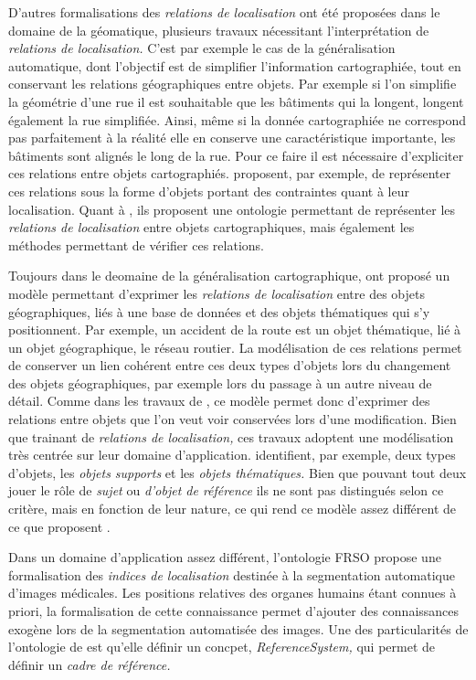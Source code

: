 D'autres formalisations des \emph{relations de localisation} ont été
proposées dans le domaine de la géomatique, plusieurs travaux
nécessitant l'interprétation de \emph{relations de localisation.}
C'est par exemple le cas de la généralisation automatique, dont
l'objectif est de simplifier l'information cartographiée, tout en
conservant les relations géographiques entre objets. Par exemple si
l'on simplifie la géométrie d'une rue il est souhaitable que les
bâtiments qui la longent, longent également la rue simplifiée. Ainsi,
même si la donnée cartographiée ne correspond pas parfaitement à la
réalité elle en conserve une caractéristique importante, les bâtiments
sont alignés le long de la rue. Pour ce faire il est nécessaire
d'expliciter ces relations entre objets
cartographiés. \textcite{Duchene2004,Gaffuri2008} proposent, par
exemple, de représenter ces relations sous la forme d'objets portant
des contraintes quant à leur localisation. Quant à
\textcite{Touya2012}, ils proposent une ontologie permettant de
représenter les \emph{relations de localisation} entre objets
cartographiques, mais également les méthodes permettant de vérifier
ces relations.

Toujours dans le deomaine de la généralisation cartographique,
\textcite{Jaara2012} ont proposé un modèle permettant d'exprimer les
\emph{relations de localisation} entre des objets géographiques, liés
à une base de données et des objets thématiques qui s'y
positionnent. Par exemple, un accident de la route est un objet
thématique, lié à un objet géographique, le réseau routier. La
modélisation de ces relations permet de conserver un lien cohérent
entre ces deux types d'objets lors du changement des objets
géographiques, par exemple lors du passage à un autre niveau de
détail. Comme dans les travaux de \textcite{Duchene2004,Gaffuri2008,
  Touya2012}, ce modèle permet donc d'exprimer des relations entre
objets que l'on veut voir conservées lors d'une modification. Bien que
trainant de \emph{relations de localisation,} ces travaux adoptent une
modélisation très centrée sur leur domaine
d’application. \textcite{Jaara2012} identifient, par exemple, deux
types d'objets, les \emph{objets supports} et les \emph{objets
  thématiques.} Bien que pouvant tout deux jouer le rôle de
\emph{sujet} ou \emph{d'objet de référence} ils ne sont pas distingués
selon ce critère, mais en fonction de leur nature, ce qui rend ce
modèle assez différent de ce que proposent
\textcite{Bateman2010,Pustejovsky2017}.

Dans un domaine d’application assez différent, l'ontologie FRSO
\textcite{Hudelot2008a} propose une formalisation des \emph{indices de
  localisation} destinée à la segmentation automatique d'images
médicales. Les positions relatives des organes humains étant connues à
priori, la formalisation de cette connaissance permet d'ajouter des
connaissances exogène lors de la segmentation automatisée des
images. Une des particularités de l'ontologie de
\textcite{Hudelot2008a} est qu'elle définir un concpet,
\emph{ReferenceSystem,} qui permet de définir un \emph{cadre de
  référence.}

